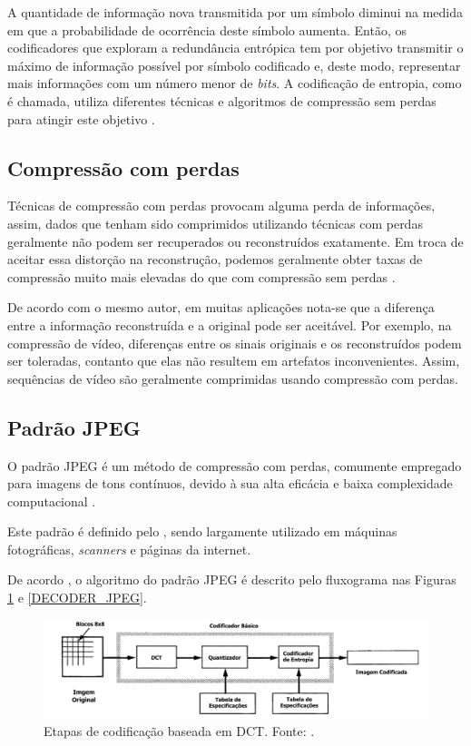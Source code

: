 A quantidade de informação nova transmitida por um símbolo diminui na medida em que a probabilidade de ocorrência deste símbolo aumenta. Então, os codificadores que exploram a redundância entrópica tem por objetivo transmitir o máximo de informação possível por símbolo codificado e, deste modo, representar
mais informações com um número menor de \textit{bits}. A codificação de entropia, como é chamada, utiliza diferentes técnicas e algoritmos de compressão sem perdas para atingir este objetivo \cite{da2007estudo}.

\subsection{Compressão com perdas}

Técnicas de compressão com perdas provocam alguma perda de informações, assim, dados que tenham sido comprimidos utilizando técnicas com perdas geralmente não podem ser recuperados ou reconstruídos exatamente. Em troca de aceitar essa distorção na reconstrução, podemos geralmente obter taxas de compressão muito mais elevadas do que com compressão sem perdas  \cite{sayood2012introduction}.

De acordo com o mesmo autor, em muitas aplicações nota-se que a diferença entre a informação reconstruída e a original pode ser aceitável. Por exemplo, na compressão de vídeo, diferenças entre os sinais originais e os reconstruídos podem ser toleradas, contanto que elas não resultem em artefatos inconvenientes. Assim, sequências de vídeo são geralmente comprimidas usando compressão com perdas.

\subsection{Padrão JPEG} \label{JPEG}
 O padrão JPEG é um método de compressão com perdas, comumente empregado para imagens de tons contínuos, devido à sua alta eficácia e baixa complexidade computacional \cite{wang2008jpeg}.
 
Este padrão é definido pelo \cite{T.81}, sendo largamente utilizado em máquinas fotográficas, \textit{scanners} e páginas da internet. 

De acordo \cite{wallace1991jpeg}, o algoritmo do padrão JPEG é descrito pelo fluxograma nas Figuras \ref{ENCODER_JPEG} e \ref{DECODER_JPEG}.

\begin{figure}[h]
	\centering
	\includegraphics[scale=0.55]{figuras/ENCODER-JPEG.pdf}
	\caption{Etapas de codificação baseada em DCT. Fonte: \cite{wallace1991jpeg}.}
	\label{ENCODER_JPEG}
\end{figure}

